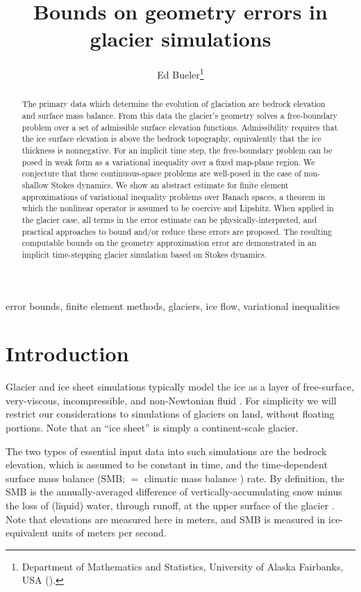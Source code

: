 \documentclass[hidelinks,onefignum,onetabnum,final]{siamart220329}  %
\title{Bounds on geometry errors in glacier simulations}
\author{Ed Bueler\thanks{Department of Mathematics and Statistics, University of Alaska Fairbanks, USA (\email{elbueler@alaska.edu}).}}
\begin{document}
\maketitle

\begin{abstract}
The primary data which determine the evolution of glaciation are bedrock elevation and surface mass balance.  From this data the glacier's geometry solves a free-boundary problem over a set of admissible surface elevation functions.  Admissibility requires that the ice surface elevation is above the bedrock topography, equivalently that the ice thickness is nonnegative.  For an implicit time step, the free-boundary problem can be posed in weak form as a variational inequality over a fixed map-plane region.  We conjecture that these continuous-space problems are well-posed in the case of non-shallow Stokes dynamics.  We show an abstract estimate for finite element approximations of variational inequality problems over Banach spaces, a theorem in which the nonlinear operator is assumed to be coercive and Lipshitz.  When applied in the glacier case, all terms in the error estimate can be physically-interpreted, and practical approaches to bound and/or reduce these errors are proposed.  The resulting computable bounds on the geometry approximation error are demonstrated in an implicit time-stepping glacier simulation based on Stokes dynamics.
\end{abstract}

\begin{keywords}
error bounds, finite element methods, glaciers, ice flow, variational inequalities
\end{keywords}



\section{Introduction} \label{sec:intro}

Glacier and ice sheet simulations typically model the ice as a layer of free-surface, very-viscous, incompressible, and non-Newtonian fluid \cite{GreveBlatter2009,SchoofHewitt2013}.  For simplicity we will restrict our considerations to simulations of glaciers on land, without floating portions.  Note that an ``ice sheet'' is simply a continent-scale glacier.

The two types of essential input data into such simulations are the bedrock elevation, which is assumed to be constant in time, and the time-dependent surface mass balance (SMB; $=$ climatic mass balance \cite{Cogleyetal2011}) rate.  By definition, the SMB is the annually-averaged difference of vertically-accumulating snow minus the loss of (liquid) water, through runoff, at the upper surface of the glacier \cite{Cogleyetal2011}.  Note that elevations are measured here in meters, and SMB is measured in ice-equivalent units of meters per second.
\end{document}
